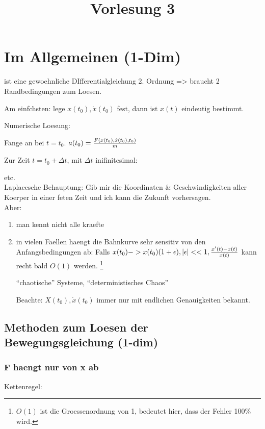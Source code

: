 \title{Vorlesung 3}

\section{Im Allgemeinen (1-Dim)}


ist eine gewoehnliche DIfferentialgleichung 2. Ordnung => braucht 2 Randbedingungen zum Loesen.

Am einfchsten: lege $x(t_0), \dot x(t_0)$ fest, dann ist $x(t)$ eindeutig bestimmt.

Numerische Loesung:

Fange an bei $t = t_0$. $a(t_0) = {F(x(t_0), \dot x(t_0), t_0) \over m}$

Zur Zeit $t = t_0 + \Delta t$, mit $\Delta t$ inifinitesimal: 

etc.\\


Laplacesche Behauptung:
Gib mir die Koordinaten \& Geschwindigkeiten aller Koerper in einer feten Zeit und ich kann die Zukunft vorhersagen.\\

Aber:
\begin{enumerate}
	\item man kennt nicht alle kraefte
	\item in vielen Faellen haengt die Bahnkurve sehr sensitiv von den Anfangsbedingungen ab:
	Falls $x(t_0) -> x(t_0)(1 + \epsilon), |\epsilon| << 1, {x'(t) - x(t) \over x(t)}$ kann recht bald $O(1)$ werden. \footnote{$O(1)$ ist die Groessenordnung von 1, bedeutet hier, dass der Fehler 100\% wird.}

	 ``chaotische'' Systeme, ``deterministisches Chaos''

	 Beachte: $X(t_0), \dot x(t_0)$ immer nur mit endlichen Genauigkeiten bekannt.
\end{enumerate}

\subsection{Methoden zum Loesen der Bewegungsgleichung (1-dim)}

\subsubsection*{F haengt nur von x ab}
Kettenregel:

